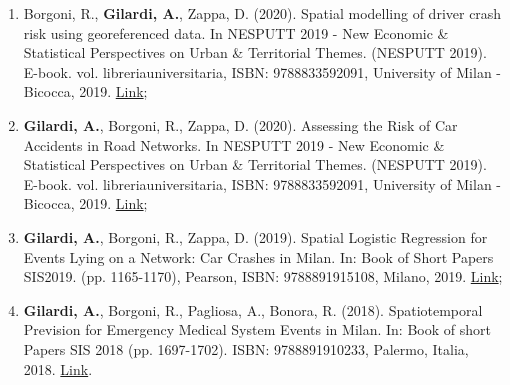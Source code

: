 \documentclass[11pt,a4paper,sans]{moderncv}
\begin{document}
\begin{enumerate}
  \item Borgoni, R., \textbf{Gilardi, A.}, Zappa, D. (2020). Spatial modelling of driver crash risk using georeferenced data. In NESPUTT 2019 - New Economic \& Statistical Perspectives on Urban \& Territorial Themes. (NESPUTT 2019). E-book. vol. libreriauniversitaria, ISBN: 9788833592091, University of Milan - Bicocca, 2019. \href{https://www.libreriauniversitaria.it/ebook/9788833592091/autore-riccardo-borgoni/new-economic-statistical-perspectives-on-urban-and-territorial-themes-nesputt-2019-e-book.htm}{Link};
  \item \textbf{Gilardi, A.}, Borgoni, R., Zappa, D. (2020). Assessing the Risk of Car Accidents in Road Networks. In NESPUTT 2019 - New Economic \& Statistical Perspectives on Urban \& Territorial Themes. (NESPUTT 2019). E-book. vol. libreriauniversitaria, ISBN: 9788833592091, University of Milan - Bicocca, 2019.  \href{https://www.libreriauniversitaria.it/ebook/9788833592091/autore-riccardo-borgoni/new-economic-statistical-perspectives-on-urban-and-territorial-themes-nesputt-2019-e-book.htm}{Link};
  \item \textbf{Gilardi, A.}, Borgoni, R., Zappa, D. (2019). Spatial Logistic Regression for Events Lying on a Network: Car Crashes in Milan. In: Book of Short Papers SIS2019. (pp. 1165-1170), Pearson, ISBN: 9788891915108, Milano, 2019.   \href{https://it.pearson.com/content/dam/region-core/italy/pearson-italy/pdf/Dirigenti%20e%20istituzioni/ISTITUZIONI-HE-PDF-sis2019_V4.pdf}{Link};
  \item \textbf{Gilardi, A.}, Borgoni, R., Pagliosa, A., Bonora, R. (2018).  Spatiotemporal Prevision for Emergency Medical System Events in Milan. In: Book of short Papers SIS 2018 (pp. 1697-1702). ISBN: 9788891910233, Palermo, Italia, 2018. \href{https://it.pearson.com/content/dam/region-core/italy/pearson-italy/pdf/Dirigenti%20e%20istituzioni/ISTITUZIONI%20-%20HE%20-%20PDF%20-%20SIS%20V4.pdf}{Link}. 
  \end{enumerate}
\end{document}

